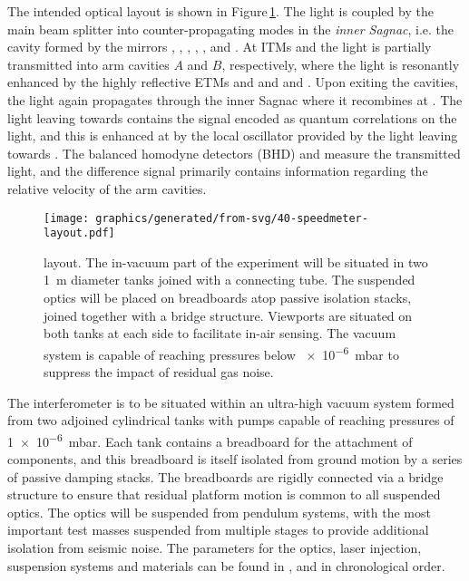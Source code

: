 The intended optical layout is shown in Figure\,\ref{fig:ssm-layout}. The light is coupled by the main beam splitter \MSIX{} into counter-propagating modes in the \emph{inner Sagnac}, i.e. the cavity formed by the mirrors \MSIX{}, \MSEVEN{}, \MONEA{}, \MTEN{}, \MNINE{}, \MEIGHT{} and \MONEB{}. At \glspl{ITM} \MONEA{} and \MONEB{} the light is partially transmitted into arm cavities $A$ and $B$, respectively, where the light is resonantly enhanced by the highly reflective \glspl{ETM} \MTWOA{} and \MTHREEA{} and \MTWOB{} and \MTHREEB{}. Upon exiting the cavities, the light again propagates through the inner Sagnac where it recombines at \MSIX{}. The light leaving \MSIX{} towards \MFOURTEEN{} contains the signal encoded as quantum correlations on the light, and this is enhanced at \MSIXTEEN{} by the local oscillator provided by the light leaving \MSIX{} towards \MTWELVE{}. The balanced homodyne detectors (\gls{BHD}) \HDA{} and \HDB{} measure the transmitted light, and the difference signal primarily contains information regarding the relative velocity of the arm cavities.

\begin{figure}
  \centering
  \texttt{[image: graphics/generated/from-svg/40-speedmeter-layout.pdf]}
  \caption[\SSMEXPT{} layout]{\label{fig:ssm-layout}\SSMEXPT{} layout. The in-vacuum part of the experiment will be situated in two \SI{1}{\meter} diameter tanks joined with a connecting tube. The suspended optics will be placed on breadboards atop passive isolation stacks, joined together with a bridge structure. Viewports are situated on both tanks at each side to facilitate in-air sensing. The vacuum system is capable of reaching pressures below \SI{e-6}{\milli\bar} to suppress the impact of residual gas noise.}
\end{figure}

The interferometer is to be situated within an ultra-high vacuum system formed from two adjoined cylindrical tanks with pumps capable of reaching pressures of \SI{1e-6}{\milli\bar}. Each tank contains a breadboard for the attachment of components, and this breadboard is itself isolated from ground motion by a series of passive damping stacks. The breadboards are rigidly connected via a bridge structure to ensure that residual platform motion is common to all suspended optics. The optics will be suspended from pendulum systems, with the most important test masses suspended from multiple stages to provide additional isolation from seismic noise. The parameters for the optics, laser injection, suspension systems and materials can be found in \cite{Graef2014}, \cite{Danilishin2015} and \cite{Leavey2016} in chronological order.

